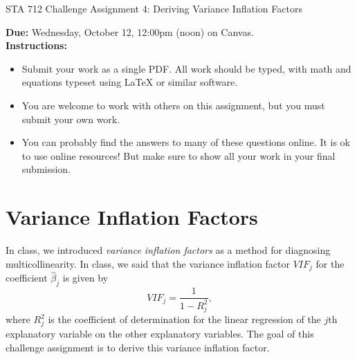 \documentclass[11pt]{article}
\begin{document}
\begin{center}
\Large
STA 712 Challenge Assignment 4: Deriving Variance Inflation Factors\\
\normalsize
\vspace{5mm}
\end{center}

\noindent \textbf{Due:} Wednesday, October 12, 12:00pm (noon) on Canvas.\\ 

\noindent \textbf{Instructions:} 
\begin{itemize}
\item Submit your work as a single PDF. All work should be typed, with math and equations typeset using LaTeX or similar software.
\item You are welcome to work with others on this assignment, but you must submit your own work.
\item You can probably find the answers to many of these questions online. It is ok to use online resources! But make sure to show all your work in your final submission.
\end{itemize}

\section*{Variance Inflation Factors}

In class, we introduced \textit{variance inflation factors} as a method for diagnosing multicollinearity. In class, we said that the variance inflation factor $VIF_j$ for the coefficient $\widehat{\beta}_j$ is given by
$$VIF_j = \dfrac{1}{1 - R^2_j},$$
where $R^2_j$ is the coefficient of determination for the linear regression of the $j$th explanatory variable on the other explanatory variables. The goal of this challenge assignment is to derive this variance inflation factor.
\end{document}
